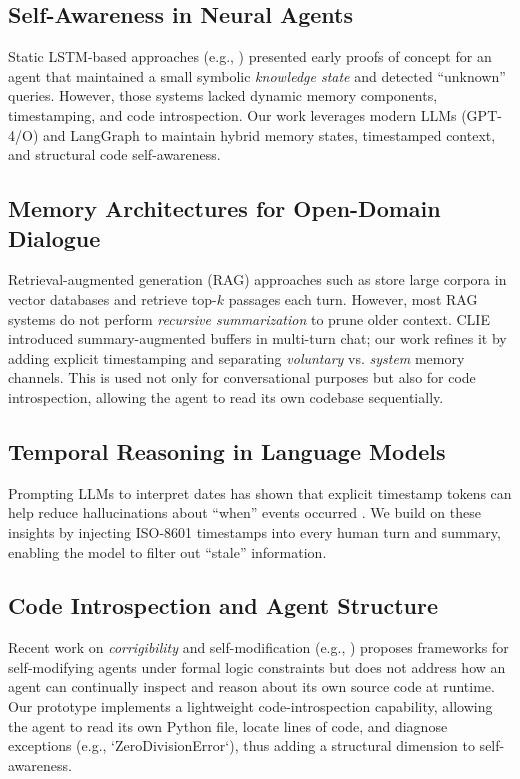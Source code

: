 \documentclass[11pt]{article}
\begin{document}
\subsection{Self-Awareness in Neural Agents}
Static LSTM-based approaches (e.g., \cite{Mukai2020}) presented early proofs of concept for an agent that maintained a small symbolic \emph{knowledge state} and detected “unknown” queries. However, those systems lacked dynamic memory components, timestamping, and code introspection. Our work leverages modern LLMs (GPT-4/O) \cite{ChenGupta2024} and LangGraph to maintain hybrid memory states, timestamped context, and structural code self-awareness.

\subsection{Memory Architectures for Open-Domain Dialogue}
Retrieval-augmented generation (RAG) approaches such as \cite{Lewis2020} store large corpora in vector databases and retrieve top-$k$ passages each turn. However, most RAG systems do not perform \emph{recursive summarization} to prune older context. CLIE \cite{Sanh2022} introduced summary-augmented buffers in multi-turn chat; our work refines it by adding explicit timestamping and separating \emph{voluntary} vs. \emph{system} memory channels.  This is used not only for conversational purposes but also for code introspection, allowing the agent to read its own codebase sequentially.

\subsection{Temporal Reasoning in Language Models}
Prompting LLMs to interpret dates has shown that explicit timestamp tokens can help reduce hallucinations about “when” events occurred \cite{Zhang2023}. We build on these insights by injecting ISO-8601 timestamps into every human turn and summary, enabling the model to filter out “stale” information.

\subsection{Code Introspection and Agent Structure}
Recent work on \emph{corrigibility} and self-modification (e.g., \cite{Soares2015}) proposes frameworks for self-modifying agents under formal logic constraints but does not address how an agent can continually inspect and reason about its own source code at runtime. Our prototype implements a lightweight code-introspection capability, allowing the agent to read its own Python file, locate lines of code, and diagnose exceptions (e.g., `ZeroDivisionError`), thus adding a structural dimension to self-awareness.
\end{document}
